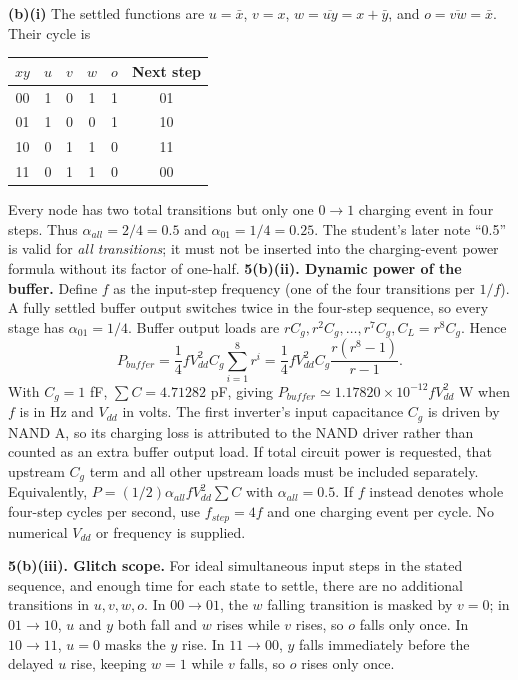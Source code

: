 \documentclass[10pt]{article}
\begin{document}
\textbf{(b)(i)} The settled functions are $u=\bar x$, $v=x$, $w=\overline{uy}=x+\bar y$, and $o=\overline{vw}=\bar x$. Their cycle is
\begin{center}\begin{tabular}{cccccc}\toprule $xy$ & $u$ & $v$ & $w$ & $o$ & Next step\\\midrule 00&1&0&1&1&01\\01&1&0&0&1&10\\10&0&1&1&0&11\\11&0&1&1&0&00\\\bottomrule\end{tabular}\end{center}
Every node has two total transitions but only one $0\to1$ charging event in four steps. Thus $\alpha_{all}=2/4=0.5$ and $\alpha_{01}=1/4=0.25$. The student's later note ``0.5'' is valid for \emph{all transitions}; it must not be inserted into the charging-event power formula without its factor of one-half.
\newpage
\textbf{5(b)(ii). Dynamic power of the buffer.}
Define $f$ as the input-step frequency (one of the four transitions per $1/f$). A fully settled buffer output switches twice in the four-step sequence, so every stage has $\alpha_{01}=1/4$. Buffer output loads are $rC_g,r^2C_g,\ldots,r^7C_g,C_L=r^8C_g$. Hence
\[\boxed{P_{buffer}=\frac14 fV_{dd}^2 C_g\sum_{i=1}^{8}r^i
=\frac14fV_{dd}^2 C_g\frac{r(r^8-1)}{r-1}.}\]
With $C_g=1$ fF, $\sum C=4.71282$ pF, giving $P_{buffer}\simeq1.17820\times10^{-12}fV_{dd}^2$ W when $f$ is in Hz and $V_{dd}$ in volts.
The first inverter's input capacitance $C_g$ is driven by NAND A, so its charging loss is attributed to the NAND driver rather than counted as an extra buffer output load. If total circuit power is requested, that upstream $C_g$ term and all other upstream loads must be included separately. Equivalently, $P=(1/2)\alpha_{all} f V_{dd}^2\sum C$ with $\alpha_{all}=0.5$. If $f$ instead denotes whole four-step cycles per second, use $f_{step}=4f$ and one charging event per cycle. No numerical $V_{dd}$ or frequency is supplied.

\textbf{5(b)(iii). Glitch scope.} For ideal simultaneous input steps in the stated sequence, and enough time for each state to settle, there are no additional transitions in $u,v,w,o$. In $00\to01$, the $w$ falling transition is masked by $v=0$; in $01\to10$, $u$ and $y$ both fall and $w$ rises while $v$ rises, so $o$ falls only once. In $10\to11$, $u=0$ masks the $y$ rise. In $11\to00$, $y$ falls immediately before the delayed $u$ rise, keeping $w=1$ while $v$ falls, so $o$ rises only once.
\end{document}
